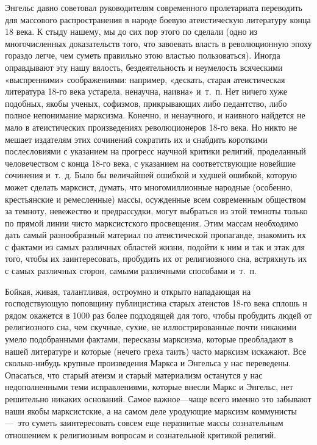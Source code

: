 Энгельс давно советовал руководителям современного пролетариата переводить
для массового распространения в народе боевую атеистическую литературу
конца 18 века. К стыду нашему, мы до сих пор этого по сделали (одно из
многочисленных доказательств того, что завоевать власть в революционную
эпоху гораздо легче, чем суметь правильно этою властью пользоваться).
Иногда оправдывают эту нашу вялость, бездеятельность и неумелость
всяческими «выспренними» соображениями: например, «дескать, старая
атеистическая литература 18-го века устарела, ненаучна, наивна» и~т.~п. Нет
ничего хуже подобных, якобы ученых, софизмов, прикрывающих либо педантство,
либо полное непонимание марксизма. Конечно, и ненаучного, и наивного
найдется не мало в атеистических произведениях революционеров 18-го века.
Но никто не мешает издателям этих сочинений сократить их и снабдить
короткими послесловиями с указанием на прогресс научной критики религий,
проделанный человечеством с конца 18-го века, с указанием на
соответствующие новейшие сочинения и~т.~д. Было бы величайшей ошибкой и
худшей ошибкой, которую может сделать марксист, думать, что многомиллионные
народные (особенно, крестьянские и ремесленные) массы, осужденные всем
современным обществом за темноту, невежество и предрассудки, могут
выбраться из этой темноты только по прямой линии чисто марксистского
просвещения. Этим массам необходимо дать самый разнообразный материал по
атеистической пропаганде, знакомить их с фактами из самых различных
областей жизни, подойти к ним и так и этак для того, чтобы их
заинтересовать, пробудить их от религиозного сна, встряхнуть их с самых
различных сторон, самыми различными способами и~т.~п.

Бойкая, живая, талантливая, остроумно и открыто нападающая на господствующую
поповщину публицистика старых атеистов 18-го века сплошь н рядом окажется в
1000 раз более подходящей для того, чтобы пробудить людей от религиозного
сна, чем скучные, сухие, не иллюстрированные почти никакими умело
подобранными фактами, пересказы марксизма, которые преобладают в нашей
литературе и которые (нечего греха таить) часто марксизм искажают. Все
сколько-нибудь крупные произведения Маркса и Энгельса у нас переведены.
Опасаться, что старый атеизм и старый материализм останутся у нас
недополненными теми исправлениями, которые внесли Маркс и Энгельс, нет
решительно никаких оснований. Самое важное—чаще всего именно это забывают
наши якобы марксистские, а на самом деле уродующие марксизм коммунисты
—~это суметь заинтересовать совсем еще неразвитые массы сознательным
отношением к религиозным вопросам и сознательной критикой религий.

